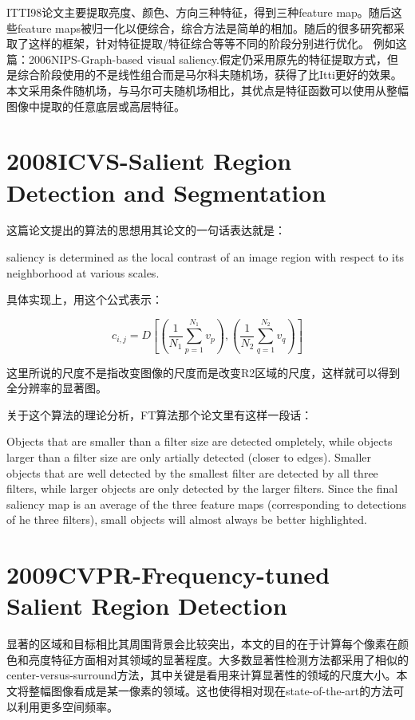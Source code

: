 \documentclass[a4paper,12pt]{article}
\begin{document}
ITTI98论文主要提取亮度、颜色、方向三种特征，得到三种feature map。随后这些feature maps被归一化以便综合，综合方法是简单的相加。随后的很多研究都采取了这样的框架，针对特征提取/特征综合等等不同的阶段分别进行优化。
例如这篇：2006NIPS-Graph-based visual saliency.假定仍采用原先的特征提取方式，但是综合阶段使用的不是线性组合而是马尔科夫随机场，获得了比Itti更好的效果。本文采用条件随机场，与马尔可夫随机场相比，其优点是特征函数可以使用从整幅图像中提取的任意底层或高层特征。

\section{2008ICVS-Salient Region Detection and Segmentation}
这篇论文提出的算法的思想用其论文的一句话表达就是：

saliency is determined as the local contrast of an image region with respect to its neighborhood at various scales.

具体实现上，用这个公式表示：

\begin{displaymath}
c_{i,j}=D\left[\left(\frac{1}{N_1}\sum_{p=1}^{N_1} v_p\right),\left(\frac{1}{N_2}\sum_{q=1}^{N_2} v_q\right)\right]
\end{displaymath}

这里所说的尺度不是指改变图像的尺度而是改变R2区域的尺度，这样就可以得到全分辨率的显著图。



关于这个算法的理论分析，FT算法那个论文里有这样一段话：

Objects that are smaller than a ﬁlter size are detected ompletely, while objects larger than a ﬁlter size are only artially detected (closer to edges). Smaller objects that are well detected by the smallest ﬁlter are detected by all three ﬁlters, while larger objects are only detected by the larger ﬁlters. Since the ﬁnal saliency map is an average of the three feature maps (corresponding to detections of he three ﬁlters), small objects will almost always be better highlighted.

\section{2009CVPR-Frequency-tuned Salient Region Detection}

显著的区域和目标相比其周围背景会比较突出，本文的目的在于计算每个像素在颜色和亮度特征方面相对其领域的显著程度。大多数显著性检测方法都采用了相似的center-versus-surround方法，其中关键是看用来计算显著性的领域的尺度大小。本文将整幅图像看成是某一像素的领域。这也使得相对现在state-of-the-art的方法可以利用更多空间频率。
\end{document}
